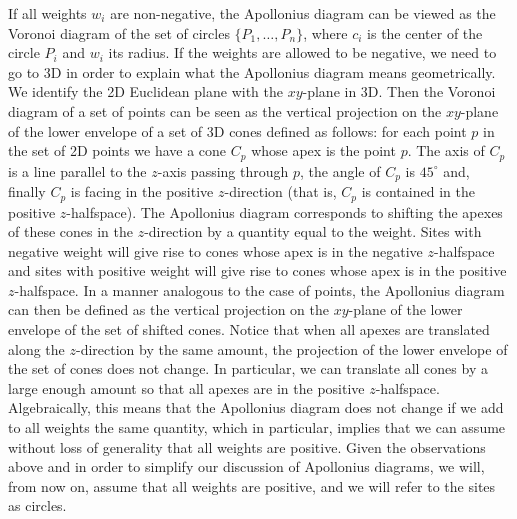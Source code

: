 If all weights $w_i$ are non-negative, the Apollonius
diagram can be viewed as the Voronoi diagram of the set of circles
$\{P_1,\ldots, P_n\}$, where $c_i$ is the center of the circle $P_i$
and $w_i$ its radius. If the weights are allowed to be negative,
we need to go to 3D in order to explain what the Apollonius diagram
means geometrically. We identify the 2D Euclidean plane with the
$xy$-plane in 3D. Then the Voronoi diagram of a set of points can be
seen as the vertical projection on the $xy$-plane of the lower
envelope of a set of 3D cones defined as follows: for each point $p$
in the set of 2D points we have a cone $C_p$ whose apex is the point
$p$. The axis of 
$C_p$ is a line parallel to the $z$-axis passing through $p$, the
angle of $C_p$ is $45^\circ$ and, finally $C_p$ is facing in the
positive $z$-direction (that is, $C_p$ is contained in the positive
$z$-halfspace).
The Apollonius diagram corresponds to shifting the
apexes of these cones in the $z$-direction by a quantity equal to the
weight. Sites with negative weight will give rise to
cones whose apex is in the negative $z$-halfspace and sites
with positive weight will give rise to cones whose apex is in the
positive $z$-halfspace. In a manner analogous to the case of points,
the Apollonius diagram can then be defined as the vertical projection
on the $xy$-plane of the lower envelope of the set of shifted cones.
Notice that when all apexes are translated along the $z$-direction by
the same amount, the projection of the lower envelope of the set of
cones does not change. In particular, we can translate all cones by a
large enough amount so that all apexes are in the positive
$z$-halfspace. Algebraically, this means that the Apollonius diagram
does not change if we add to all weights the same quantity, which in
particular, implies that we can assume without loss of generality that
all weights are positive. Given the observations above and in order to
simplify our discussion of Apollonius diagrams, we will, from now on,
assume that all weights are positive, and we will refer to the
sites as circles.


